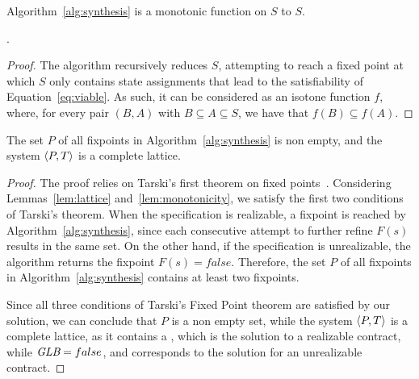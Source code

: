 

\begin{lemma} Algorithm~\ref{alg:synthesis} is a monotonic function on $S$ to
$S$.

.
\label{lem:monotonicity}
\end{lemma}
\begin{proof}
The algorithm recursively reduces $S$, attempting to reach a fixed point
at which $S$ only contains state assignments that lead to the satisfiability of
Equation~\ref{eq:viable}. As such, it can be considered as an isotone function
$f$, where, for every pair $(B,A)$ with $B \subseteq A \subseteq S$, we have that
$f(B) \subseteq f(A)$.
\end{proof}

\begin{theorem}
The set $P$ of all fixpoints in Algorithm~\ref{alg:synthesis} is non
empty, and the system $\langle P, T \rangle$ is a complete lattice.
\label{thm:fixpoint}
\end{theorem}
\begin{proof}
The proof relies on Tarski's first theorem on fixed
points~\cite{tarski1955lattice}.
Considering Lemmas~\ref{lem:lattice} and~\ref{lem:monotonicity}, we satisfy the first two
conditions of Tarski's theorem. When the specification is realizable, a
fixpoint is reached by Algorithm~\ref{alg:synthesis}, since each consecutive
attempt to further refine $F(s)$ results in the same set. On the other hand, if
the specification is unrealizable, the algorithm returns the fixpoint $F(s) = false$. Therefore, the
set $P$ of all fixpoints in Algorithm~\ref{alg:synthesis} contains at least two
fixpoints.

Since all three conditions of Tarski's Fixed Point theorem are satisfied by our
solution, we can conclude that $P$ is a non empty set, while the system
$\langle P, T \rangle$ is a complete lattice, as it contains a \lub, which is
the solution to a realizable contract, while $\textit {GLB} = false$, and corresponds to
the solution for an unrealizable contract.
\end{proof}
\fi

